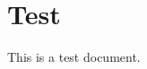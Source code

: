 \documentclass[12pt]{article}
\begin{document}
\section{Test}
This is a test document.
\end{document}
